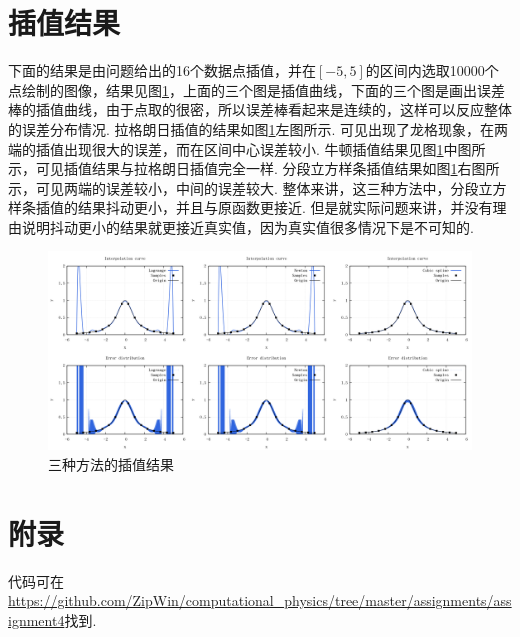 \documentclass{article}
\begin{document}
	\section{插值结果}
	下面的结果是由问题给出的16个数据点插值，并在$[-5,5]$的区间内选取10000个点绘制的图像，结果见图\ref{fig:result}，上面的三个图是插值曲线，下面的三个图是画出误差棒的插值曲线，由于点取的很密，所以误差棒看起来是连续的，这样可以反应整体的误差分布情况. 拉格朗日插值的结果如图\ref{fig:result}左图所示. 可见出现了龙格现象，在两端的插值出现很大的误差，而在区间中心误差较小. 牛顿插值结果见图\ref{fig:result}中图所示，可见插值结果与拉格朗日插值完全一样. 分段立方样条插值结果如图\ref{fig:result}右图所示，可见两端的误差较小，中间的误差较大. 整体来讲，这三种方法中，分段立方样条插值的结果抖动更小，并且与原函数更接近. 但是就实际问题来讲，并没有理由说明抖动更小的结果就更接近真实值，因为真实值很多情况下是不可知的.
	\begin{figure}[h!tb]
		\centering
		\includegraphics[width=1.0\textwidth]{./utils/result.png}
		\caption{ 三种方法的插值结果\label{fig:result}}
	\end{figure}

	\newpage
	\section*{附录}
	代码可在\url{https://github.com/ZipWin/computational_physics/tree/master/assignments/assignment4}找到.
	
	
\end{document}
